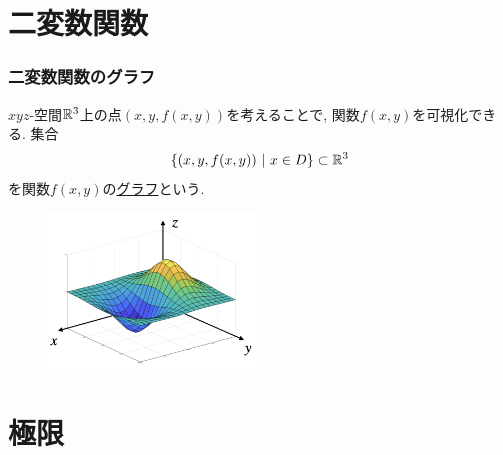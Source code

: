 


\section{二変数関数}


\begin{frame}
\frametitle{二変数関数のグラフ}


$xyz$-空間$\mathbb{R}^3$上の点$(x,y,f(x,y))$を考えることで, 関数$f(x,y)$を可視化できる. 
集合
$$
\{(x,y,f(x,y)) \ | \ x \in D\} \subset \mathbb{R}^3
$$
を関数$f(x,y)$の\underline{グラフ}という. 

\vspace{-3mm}

\begin{figure}[htbp]
 \begin{center} 
  \includegraphics[width=55mm]{calculus10/graph3d.png}
 \end{center}
\end{figure}

\vspace{-3mm}

\end{frame}





\section{極限}


